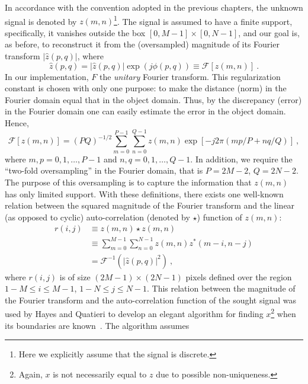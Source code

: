 In accordance with the convention adopted in the previous chapters,
the unknown signal is denoted by $z(m,n)$\footnote{Here we explicitly
  assume that the signal is discrete.}. The signal is assumed to have
a finite support, specifically, it vanishes outside the box
$[0,M-1]\times[0,N-1]$, and our goal is, as before, to
reconstruct it from the (oversampled) magnitude of its Fourier
transform $|\hat{z}(p,q)|$, where
\begin{equation}
  \label{eq:boundary-1}
  \hat{z}(p,q) =
  |\hat{z}(p,q)|\exp(j\phi(p,q))\equiv\mathcal{F}[z(m,n)]\ .
\end{equation}
In our implementation, $F$ the \textit{unitary} Fourier transform. This
regularization constant is chosen with only one purpose: to make the
distance (norm) in the Fourier domain equal that in the object
domain. Thus, by the discrepancy (error) in the Fourier domain one can
easily estimate the error in the object domain. Hence,
\begin{equation}
  \label{eq:boundary-2}
  \mathcal{F}[z(m,n)]=(PQ)^{-1/2}\sum_{m=0}^{P-1}
  \sum_{n=0}^{Q-1}z(m,n)\exp[-j2\pi (mp/P + nq/Q)]\ ,
\end{equation}
where $m,p=0,1,\ldots,P-1$ and $n,q=0,1,\ldots,Q-1$. In addition, we
require the ``two-fold oversampling'' in the Fourier domain, that is
$P=2M-2$, $Q=2N-2$. The purpose of this oversampling is to capture the
information that $z(m,n)$ has only limited support. With these
definitions, there exists one well-known relation between the squared
magnitude of the Fourier transform and the linear (as opposed to
cyclic) auto-correlation (denoted by $\star$) function of $z(m,n)$:
\begin{equation}
  \label{eq:boundary-3}
  \begin{split}
    r(i,j)
    & \equiv z(m,n) \star z(m,n) \\
    & \equiv \sum_{m=0}^{M-1}\sum_{n=0}^{N-1}z(m,n)z^{*}(m-i,n-j)\\
    & = \mathcal{F}^{-1}(|\hat{z}(p,q)|^{2})\ ,
  \end{split}
\end{equation}
where $r(i,j)$ is of size $(2M-1)\times(2N-1)$ pixels defined over the
region $1-M\leq i \leq M-1$, $1-N\leq j \leq N-1$. This relation
between the magnitude of the Fourier transform and the
auto-correlation function of the sought signal was used by Hayes and
Quatieri to develop an elegant algorithm for finding
$x$\footnote{Again, $x$ is not necessarily equal to $z$ due to
  possible non-uniqueness.} when its boundaries are
known~. The algorithm assumes

